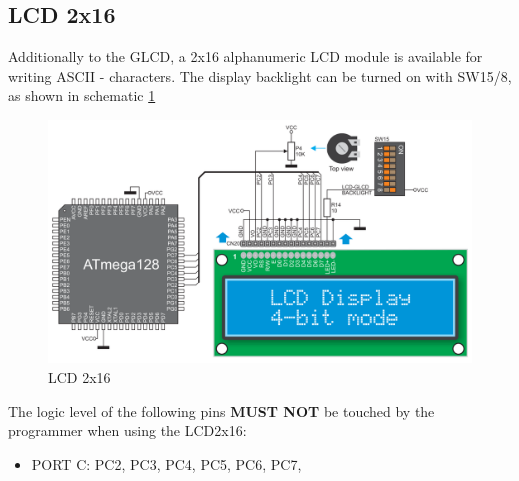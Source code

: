 \subsection{LCD 2x16}

Additionally to the GLCD, a 2x16 alphanumeric LCD module is available for writing ASCII - characters. The display backlight can be turned on with SW15/8, as shown in schematic \ref{fig:lcd2x16}  

\begin{figure}[h]
 \centerline{\includegraphics[width=.8\columnwidth]{pics/lcd2x16.png}}
  \caption{LCD 2x16}
  \label{fig:lcd2x16}
\end{figure}

The logic level of the following pins \textbf{MUST NOT} be touched by the programmer when using the LCD2x16:

\begin{itemize}
 \item PORT C: PC2, PC3, PC4, PC5, PC6, PC7, 
\end{itemize}

